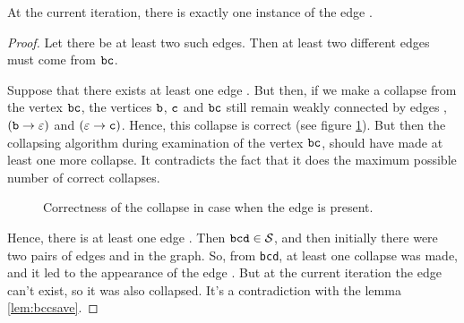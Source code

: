 \begin{lemma}
\label{lem:bbcone}
At the current iteration, there is exactly one instance of the edge .
\end{lemma}
\begin{proof}
Let there be at least two such edges. Then at least two different edges must come from $ {\tt bc} $.

Suppose that there exists at least one edge . But then, if we make a collapse from the vertex $ {\tt bc} $, the vertices $ {\tt b} $, $ {\tt c} $ and $ {\tt bc} $ still remain weakly connected by edges , $ ({\tt b} \to \varepsilon) $ and $ (\varepsilon \to {\tt c}) $. Hence, this collapse is correct (see figure \ref{fig:lvl1lemmabcc}). But then the collapsing algorithm during examination of the vertex $ {\tt bc} $, should have made at least one more collapse. It contradicts the fact that it does the maximum possible number of correct collapses.

\begin{figure}[ht]
\begin{center}

\end{center}

\caption{Correctness of the collapse in case when the edge  is present.}\label{fig:lvl1lemmabcc}
\end{figure}

Hence, there is at least one edge . Then $ {\tt bcd} \in {\cal S} $, and then initially there were two pairs of edges  and  in the graph. So, from {\tt bcd}, at least one collapse was made, and it led to the appearance of the edge . But at the current iteration the edge  can't exist, so it was also collapsed. It's a contradiction with the lemma \ref{lem:bccsave}.
\end{proof}

